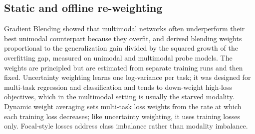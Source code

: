 \documentclass[fleqn,10pt]{wlscirep}
\begin{document}
\subsection*{Static and offline re-weighting}
Gradient Blending\cite{wang2020makes} showed that multimodal networks often underperform their best unimodal counterpart because they overfit, and derived blending weights proportional to the generalization gain divided by the squared growth of the overfitting gap, measured on unimodal and multimodal probe models. The weights are principled but are estimated from separate training runs and then fixed. Uncertainty weighting\cite{kendall2018multi} learns one log-variance per task; it was designed for multi-task regression and classification and tends to down-weight high-loss objectives, which in the multimodal setting is usually the starved modality. Dynamic weight averaging\cite{liu2019end} sets multi-task loss weights from the rate at which each training loss decreases; like uncertainty weighting, it uses training losses only. Focal-style losses\cite{lin2017focal} address class imbalance rather than modality imbalance.
\end{document}

